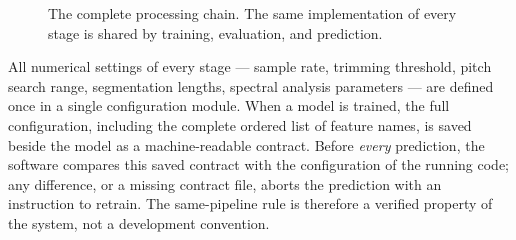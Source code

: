 \begin{figure}[htb]
\centering
{}
\caption{The complete processing chain. The same implementation of
every stage is shared by training, evaluation, and prediction.}
\label{fig:pipeline}
\end{figure}

All numerical settings of every stage --- sample rate, trimming
threshold, pitch search range, segmentation lengths, spectral analysis
parameters --- are defined once in a single configuration module. When
a model is trained, the full configuration, including the complete
ordered list of feature names, is saved beside the model as a
machine-readable contract. Before \emph{every} prediction, the software
compares this saved contract with the configuration of the running
code; any difference, or a missing contract file, aborts the prediction
with an instruction to retrain. The same-pipeline rule is therefore a
verified property of the system, not a development convention.

